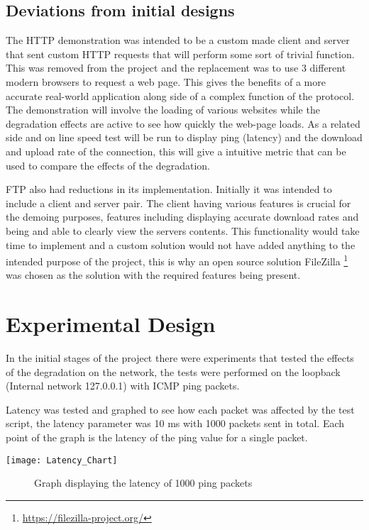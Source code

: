 \subsection{Deviations from initial designs}
The HTTP demonstration was intended to be a custom made client and server that sent custom HTTP requests that will perform some sort of trivial function. This was removed from the project and the replacement was to use 3 different modern browsers 
to request a web page. This gives the benefits of a more accurate real-world application along side of a complex function of the protocol. The demonstration will involve the loading of various websites while the degradation effects are active to see how quickly the web-page loads. As a related side and on line speed test will be run to display ping (latency) and the download and upload rate of the connection, this will give a intuitive metric that can be used to compare the effects of the degradation.

FTP also had reductions in its implementation. Initially it was intended to include a client and server pair. The client having various features is crucial for the demoing purposes, features including displaying accurate download rates and being and able to clearly view the servers contents. This functionality would take time to implement and a custom solution would not have added anything to the intended purpose of the project, this is why an open source solution FileZilla \footnote{\url{https://filezilla-project.org/}} was chosen as the solution with the required features being present.

\section{Experimental Design}
In the initial stages of the project there were experiments that tested the effects of the degradation on the network, the tests were performed on the loopback (Internal network 127.0.0.1) with ICMP ping packets.

Latency was tested and graphed to see how each packet was affected by the test script, the latency parameter was 10 ms with 1000 packets sent in total. Each point of the graph is the latency of the ping value for a single packet.

\begin{center}
	\texttt{[image: Latency\_Chart]}
	\begin{figure}[h]
		\caption{Graph displaying the latency of 1000 ping packets}
	\end{figure}
\end{center}

